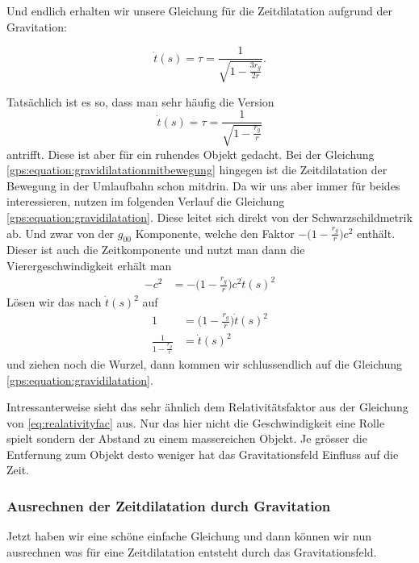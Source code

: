 \begin{refsection}
\noindent{}Und endlich erhalten wir unsere Gleichung für die Zeitdilatation aufgrund der Gravitation:

\begin{equation}
\label{gps:equation:gravidilatationmitbewegung}
\dot t(s) = \tau = \frac{1}{ \sqrt{1 - \frac{3r_g}{2r}} }.
\end{equation}

\noindent{}Tatsächlich ist es so, dass man sehr häufig die Version
\begin{equation}
\label{gps:equation:gravidilatation}
\dot t(s) = \tau = \frac{1}{ \sqrt{1 - \frac{r_g}{r} }}
\end{equation}
\noindent{}antrifft. Diese ist aber für ein ruhendes Objekt gedacht. Bei der Gleichung \eqref{gps:equation:gravidilatationmitbewegung} hingegen ist die Zeitdilatation der Bewegung in der Umlaufbahn  schon mitdrin. Da wir uns aber immer für beides interessieren, nutzen im folgenden Verlauf die Gleichung \eqref{gps:equation:gravidilatation}. Diese leitet sich direkt von der Schwarzschildmetrik ab. Und zwar von der $g_{00}$ Komponente, welche den Faktor $- \biggr( 1-\frac{r_g}{r} \biggr)c^2$ enthält. Dieser ist auch die Zeitkomponente und nutzt man dann die Vierergeschwindigkeit erhält man
\begin{align*}
-c^2 &= - \biggr( 1-\frac{r_g}{r} \biggr)c^2 \dot t(s)^2
\end{align*}
\noindent{}Lösen wir das nach $\dot t(s)^2$ auf 
\begin{align*}
1 &= \biggr( 1-\frac{r_g}{r} \biggr) \dot t(s)^2
\\
\frac{1}{ 1-\frac{r_g}{r}} &=  \dot t(s)^2
\end{align*}
\noindent{}und ziehen noch die Wurzel, dann kommen wir schlussendlich auf die Gleichung \eqref{gps:equation:gravidilatation}.

Intressanterweise sieht das sehr ähnlich dem Relativitätsfaktor aus der Gleichung von \ref{eq:realativityfac} aus. Nur das hier nicht die Geschwindigkeit eine Rolle spielt sondern der Abstand zu einem massereichen Objekt. Je grösser die Entfernung zum Objekt desto weniger hat das Gravitationsfeld Einfluss auf die Zeit. 

\subsubsection{Ausrechnen der Zeitdilatation durch Gravitation}
Jetzt haben wir eine schöne einfache Gleichung und dann können wir nun ausrechnen was für eine Zeitdilatation entsteht durch das Gravitationsfeld.


\end{refsection}
